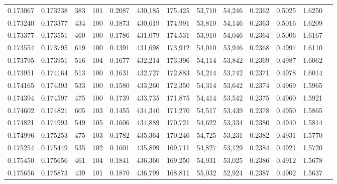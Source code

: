 \begin{tabular}{rrrrrrrrrrrrr}
0.173067 & 0.173238 &   383 & 101 &                                     0.2087 & 430,185 & 175,425 &  53,710 &  54,246 & 0.2362 & 0.5025 & 1.6250 \\
0.173240 & 0.173377 &   434 & 100 &                                     0.1873 & 430,619 & 174,991 &  53,810 &  54,146 & 0.2363 & 0.5016 & 1.6209 \\
0.173377 & 0.173551 &   460 & 100 &                                     0.1786 & 431,079 & 174,531 &  53,910 &  54,046 & 0.2364 & 0.5006 & 1.6167 \\
0.173554 & 0.173795 &   619 & 100 &                                     0.1391 & 431,698 & 173,912 &  54,010 &  53,946 & 0.2368 & 0.4997 & 1.6110 \\
0.173795 & 0.173951 &   516 & 104 &                                     0.1677 & 432,214 & 173,396 &  54,114 &  53,842 & 0.2369 & 0.4987 & 1.6062 \\
0.173951 & 0.174164 &   513 & 100 &                                     0.1631 & 432,727 & 172,883 &  54,214 &  53,742 & 0.2371 & 0.4978 & 1.6014 \\
0.174165 & 0.174393 &   533 & 100 &                                     0.1580 & 433,260 & 172,350 &  54,314 &  53,642 & 0.2374 & 0.4969 & 1.5965 \\
0.174394 & 0.174597 &   475 & 100 &                                     0.1739 & 433,735 & 171,875 &  54,414 &  53,542 & 0.2375 & 0.4960 & 1.5921 \\
0.174602 & 0.174821 &   605 & 103 &                                     0.1455 & 434,340 & 171,270 &  54,517 &  53,439 & 0.2378 & 0.4950 & 1.5865 \\
0.174821 & 0.174993 &   549 & 105 &                                     0.1606 & 434,889 & 170,721 &  54,622 &  53,334 & 0.2380 & 0.4940 & 1.5814 \\
0.174996 & 0.175253 &   475 & 103 &                                     0.1782 & 435,364 & 170,246 &  54,725 &  53,231 & 0.2382 & 0.4931 & 1.5770 \\
0.175254 & 0.175449 &   535 & 102 &                                     0.1601 & 435,899 & 169,711 &  54,827 &  53,129 & 0.2384 & 0.4921 & 1.5720 \\
0.175450 & 0.175656 &   461 & 104 &                                     0.1841 & 436,360 & 169,250 &  54,931 &  53,025 & 0.2386 & 0.4912 & 1.5678 \\
0.175656 & 0.175873 &   439 & 101 &                                     0.1870 & 436,799 & 168,811 &  55,032 &  52,924 & 0.2387 & 0.4902 & 1.5637 \\

\end{tabular}
